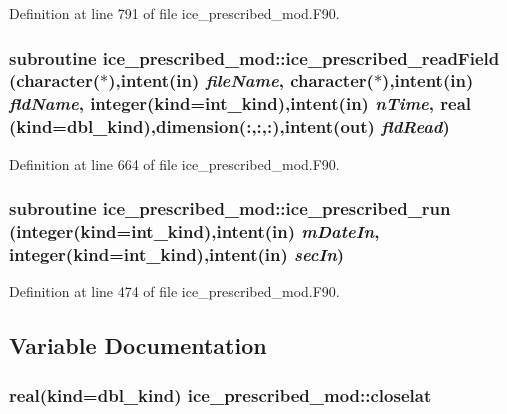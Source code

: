 Definition at line 791 of file ice\_\-prescribed\_\-mod.F90.\hypertarget{namespaceice__prescribed__mod_aa67a3710c35bda9e15dedf703582f149}{
\subsubsection[{ice\_\-prescribed\_\-readField}]{\setlength{\rightskip}{0pt plus 5cm}subroutine ice\_\-prescribed\_\-mod::ice\_\-prescribed\_\-readField (character($\ast$),intent(in) {\em fileName}, \/  character($\ast$),intent(in) {\em fldName}, \/  integer(kind=int\_\-kind),intent(in) {\em nTime}, \/  real (kind=dbl\_\-kind),dimension(:,:,:),intent(out) {\em fldRead})}}
\label{namespaceice__prescribed__mod_aa67a3710c35bda9e15dedf703582f149}


Definition at line 664 of file ice\_\-prescribed\_\-mod.F90.\hypertarget{namespaceice__prescribed__mod_a73bcaa2e547c18a24eeabaa2e22e8fe9}{
\subsubsection[{ice\_\-prescribed\_\-run}]{\setlength{\rightskip}{0pt plus 5cm}subroutine ice\_\-prescribed\_\-mod::ice\_\-prescribed\_\-run (integer(kind=int\_\-kind),intent(in) {\em mDateIn}, \/  integer(kind=int\_\-kind),intent(in) {\em secIn})}}
\label{namespaceice__prescribed__mod_a73bcaa2e547c18a24eeabaa2e22e8fe9}


Definition at line 474 of file ice\_\-prescribed\_\-mod.F90.

\subsection{Variable Documentation}
\hypertarget{namespaceice__prescribed__mod_ab6b945488fb9a21b8c0abf9c5c9f13d3}{
\subsubsection[{closelat}]{\setlength{\rightskip}{0pt plus 5cm}real(kind=dbl\_\-kind) {\bf ice\_\-prescribed\_\-mod::closelat}}}
\label{namespaceice__prescribed__mod_ab6b945488fb9a21b8c0abf9c5c9f13d3}


